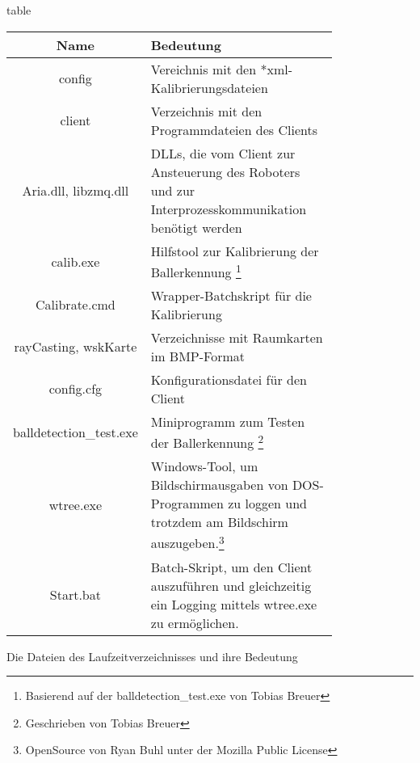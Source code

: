 \begin{nofloat}{table}{
      \centering
      \begin{tabular}{|c|p{0.8\linewidth}|}
        \hline 
        Name & Bedeutung \\ \hline
        config & Vereichnis mit den *xml-Kalibrierungsdateien\\ \hline
        client & Verzeichnis mit den Programmdateien des Clients\\ \hline
        Aria.dll, libzmq.dll & DLLs, die vom Client zur Ansteuerung
        des Roboters und zur Interprozesskommunikation benötigt werden
        \\ \hline
        calib.exe & Hilfstool zur Kalibrierung der Ballerkennung
        \footnote{Basierend auf der balldetection\_test.exe von Tobias Breuer}\\ \hline
        Calibrate.cmd &  Wrapper-Batchskript für die Kalibrierung \\ \hline
        rayCasting,  wskKarte & Verzeichnisse mit Raumkarten im
        BMP-Format\\ \hline
        config.cfg & Konfigurationsdatei für den Client\\ \hline
        balldetection\_test.exe & Miniprogramm zum Testen der
        Ballerkennung \footnote{Geschrieben von Tobias Breuer}\\ \hline
        wtree.exe & Windows-Tool, um Bildschirmausgaben von
        DOS-Programmen zu loggen und trotzdem am Bildschirm
        auszugeben.\footnote{OpenSource von Ryan Buhl unter der
          Mozilla Public License}\\ \hline
        Start.bat & Batch-Skript, um den Client auszuführen und
        gleichzeitig ein Logging mittels wtree.exe zu ermöglichen.
       \\ \hline
      \end{tabular}
      \caption{Die Dateien des Laufzeitverzeichnisses und ihre Bedeutung}
      \label{bedeutung_namen}
}
\end{nofloat}
